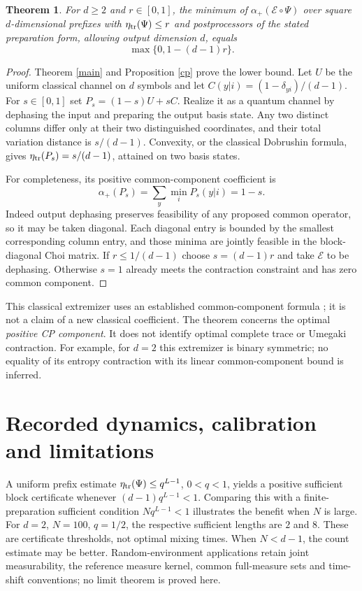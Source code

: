 \documentclass[11pt]{article}
\newtheorem{theorem}{Theorem}
\begin{document}
\begin{theorem}\label{envelope}
For $d\ge2$ and $r\in[0,1]$, the minimum of
$\alpha_+(\mathcal E\circ\Psi)$ over square $d$-dimensional prefixes with $\eta_{\rm tr}(\Psi)\le r$ and postprocessors of the stated preparation form, allowing output dimension $d$, equals
\[
 \max\{0,1-(d-1)r\}.
\]
\end{theorem}
\begin{proof}
Theorem \ref{main} and Proposition \ref{cp} prove the lower bound. Let $U$ be the uniform classical channel on $d$ symbols and let
$C(y|i)=(1-\delta_{yi})/(d-1)$. For $s\in[0,1]$ set
$P_s=(1-s)U+sC$. Realize it as a quantum channel by dephasing the input and preparing the output basis state. Any two distinct columns differ only at their two distinguished coordinates, and their total variation distance is $s/(d-1)$. Convexity, or the classical Dobrushin formula, gives
$\eta_{\rm tr}(P_s)=s/(d-1)$, attained on two basis states.

For completeness, its positive common-component coefficient is
\[
 \alpha_+(P_s)=\sum_y\min_iP_s(y|i)=1-s.
\]
Indeed output dephasing preserves feasibility of any proposed common operator, so it may be taken diagonal. Each diagonal entry is bounded by the smallest corresponding column entry, and those minima are jointly feasible in the block-diagonal Choi matrix. If $r\le1/(d-1)$ choose $s=(d-1)r$ and take $\mathcal E$ to be dephasing. Otherwise $s=1$ already meets the contraction constraint and has zero common component.
\end{proof}

This classical extremizer uses an established common-component formula \cite{MS,GHNW}; it is not a claim of a new classical coefficient. The theorem concerns the optimal \emph{positive CP component}. It does not identify optimal complete trace or Umegaki contraction. For example, for $d=2$ this extremizer is binary symmetric; no equality of its entropy contraction with its linear common-component bound is inferred.

\section{Recorded dynamics, calibration and limitations}
A uniform prefix estimate $\eta_{\rm tr}(\Psi)\le q^{L-1}$, $0<q<1$, yields a positive sufficient block certificate whenever
$(d-1)q^{L-1}<1$. Comparing this with a finite-preparation sufficient condition $Nq^{L-1}<1$ illustrates the benefit when $N$ is large. For $d=2$, $N=100$, $q=1/2$, the respective sufficient lengths are $2$ and $8$. These are certificate thresholds, not optimal mixing times. When $N<d-1$, the count estimate may be better. Random-environment applications retain joint measurability, the reference measure kernel, common full-measure sets and time-shift conventions; no limit theorem is proved here.
\end{document}

